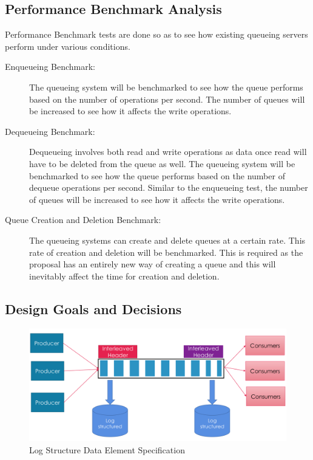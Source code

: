\documentclass[12pt,a4paper]{article}
\begin{document}
\subsection{Performance Benchmark Analysis}

Performance Benchmark tests are done so as to see how existing queueing servers perform under various conditions.

\begin{description}
	\item [Enqueueing Benchmark:] 
	The queueing system will be benchmarked to see how the queue performs based on the number of operations per second. The number of queues will be increased to see how it affects the write operations.
	
	\item [Dequeueing Benchmark:]
	Dequeueing involves both read and write operations as data once read will have to be deleted from the queue as well. The queueing system will be benchmarked to see how the queue performs based on the number of dequeue operations per second. Similar to the enqueueing test, the number of queues will be increased to see how it affects the write operations.
	
	\item [Queue Creation and Deletion Benchmark:]
	The queueing systems can create and delete queues at a certain rate. This rate of creation and deletion will be benchmarked. This is required as the proposal has an entirely new way of creating a queue and this will inevitably affect the time for creation and deletion. 
	
\end{description}


\subsection{Design Goals and Decisions}

  \begin{figure}[!htb]
  	\centering
  	\textbf{}\par\medskip
  	\includegraphics[scale=0.3]{8}
  	\caption{Log Structure Data Element Specification}
  	\label{fig:gdull08}
  \end{figure} 
  
\end{document}

